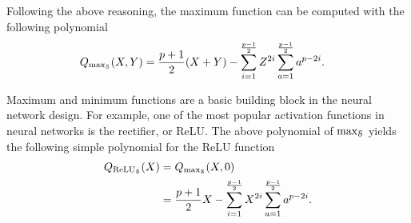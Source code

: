   Following the above reasoning, the maximum function can be computed with the following polynomial
  \begin{align*}
    Q_{\max_\S}(X,Y) &= \frac{p+1}{2} (X+Y) - \sum_{i=1}^{\frac{p-1}{2}} Z^{2i} \sum_{a=1}^{\frac{p-1}{2}} a^{p-2i}.
  \end{align*}
  \begin{remark}
    Maximum and minimum functions are a basic building block in the neural network design.
    For example, one of the most popular activation functions in neural networks is the rectifier, or ReLU.
    The above polynomial of $\max_\S$ yields the following simple polynomial for the ReLU function
    \begin{align*}
      Q_{\ReLU_\S}(X) &= Q_{\max_\S}(X,0) \\
      &= \frac{p+1}{2} X - \sum_{i=1}^{\frac{p-1}{2}} X^{2i} \sum_{a=1}^{\frac{p-1}{2}} a^{p-2i}.
    \end{align*}
  \end{remark}


